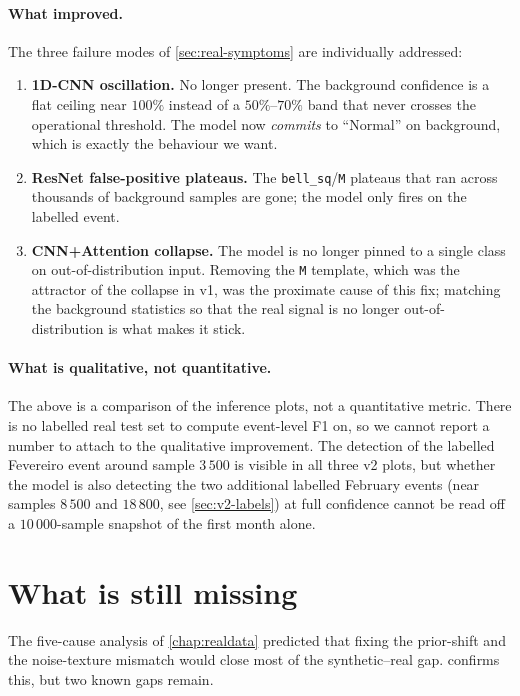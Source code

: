 \paragraph{What improved.}
The three failure modes of \cref{sec:real-symptoms} are individually
addressed:
\begin{enumerate}[leftmargin=*, itemsep=0.2em]
    \item \textbf{1D-CNN oscillation.} No longer present. The
    background confidence is a flat ceiling near $100\%$ instead of
    a $50\%$--$70\%$ band that never crosses the operational
    threshold. The model now \emph{commits} to ``Normal'' on
    background, which is exactly the behaviour we want.
    \item \textbf{ResNet false-positive plateaus.} The
    \texttt{bell\_sq}/\texttt{M} plateaus that ran across thousands of
    background samples are gone; the model only fires on the labelled
    event.
    \item \textbf{CNN+Attention collapse.} The model is no longer
    pinned to a single class on out-of-distribution input. Removing
    the \texttt{M} template, which was the attractor of the collapse
    in v1, was the proximate cause of this fix; matching the
    background statistics so that the real signal is no longer
    out-of-distribution is what makes it stick.
\end{enumerate}

\paragraph{What is qualitative, not quantitative.}
The above is a comparison of the inference plots, not a quantitative
metric. There is no labelled real test set to compute event-level F1
on, so we cannot report a number to attach to the qualitative
improvement. The detection of the labelled Fevereiro event around
sample $3\,500$ is visible in all three v2 plots, but whether the
model is also detecting the two additional labelled February events
(near samples $8\,500$ and $18\,800$, see
\cref{sec:v2-labels}) at full confidence cannot be read off a
$10\,000$-sample snapshot of the first month alone.

\section{What is still missing}
\label{sec:v2-remaining}

The five-cause analysis of \cref{chap:realdata} predicted that
fixing the prior-shift and the noise-texture mismatch would close most
of the synthetic--real gap. 
confirms this, but two known gaps remain.

